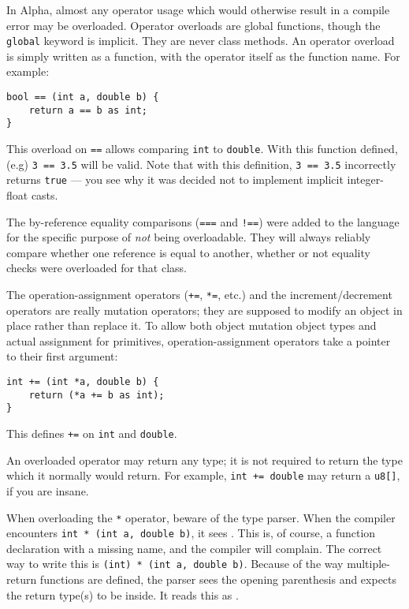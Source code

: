 \documentclass{article}
\begin{document}
In Alpha, almost any operator usage which would otherwise result in a compile
error
may be overloaded. Operator overloads are global functions, though the
\texttt{global} keyword is implicit. They are never class methods. An operator
overload is simply written as a function, with the operator itself as the
function name. For example:

\begin{verbatim}
bool == (int a, double b) {
    return a == b as int;
}
\end{verbatim}

This overload on \texttt{==} allows comparing \texttt{int} to \texttt{double}.
With this function defined, (e.g) \texttt{3 == 3.5} will be valid. Note that
with this definition, \texttt{3 == 3.5} incorrectly returns \texttt{true}
--- you see why it was decided not to implement implicit integer-float casts.

The by-reference equality comparisons (\texttt{===} and \texttt{!==}) were
added to the language for the specific purpose of \emph{not} being
overloadable. They will always reliably compare whether one reference is equal
to another, whether or not equality checks were overloaded for that class.

The operation-assignment operators (\texttt{+=}, \texttt{*=}, etc.) and the
increment/decrement operators are really
mutation operators; they are supposed to modify an object in place rather than
replace it. To allow both object mutation object types and actual assignment
for primitives, operation-assignment operators take a pointer to their first
argument:

\begin{verbatim}
int += (int *a, double b) {
    return (*a += b as int);
}
\end{verbatim}

This defines \texttt{+=} on \texttt{int} and \texttt{double}.

An overloaded operator may return any type; it is not required to return the
type which it normally would return. For example, \texttt{int += double}
may return a \texttt{u8[]}, if you are insane.

When overloading the \texttt{*} operator, beware of the type parser.
When the compiler encounters \texttt{int~*~(int~a,~double~b)}, it sees
 . This is, of course,
a function declaration with a missing name, and the compiler will complain. The
correct way to write this is \texttt{(int)~*~(int~a,~double~b)}. Because of the
way multiple-return functions are defined, the parser sees the opening
parenthesis and expects the return type(s) to be inside. It reads this as
 \fbox{*} .
\end{document}
